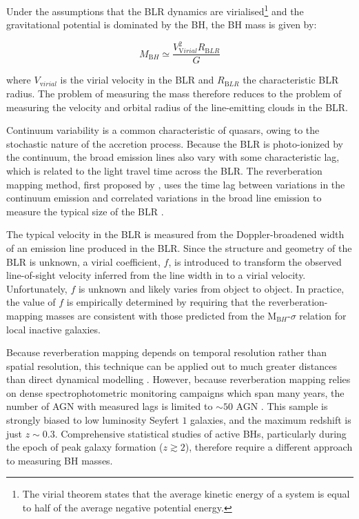 Under the assumptions that the BLR dynamics are virialised\footnote{The virial theorem states that the average kinetic energy of a system is equal to half of the average negative potential energy.} and the gravitational potential is dominated by the BH, the BH mass is given by:

\begin{equation}
M_{\mathrm BH} \simeq \frac{V_{\mathrm Virial}^2R_{\mathrm BLR}}{G} 
\end{equation}

where $V_{\mathrm virial}$ is the virial velocity in the BLR and $R_{\mathrm BLR}$ the characteristic BLR radius.
The problem of measuring the mass therefore reduces to the problem of measuring the velocity and orbital radius of the line-emitting clouds in the BLR. 

Continuum variability is a common characteristic of quasars, owing to the stochastic nature of the accretion process.  
Because the BLR is photo-ionized by the continuum, the broad emission lines also vary with some characteristic lag, which is related to the light travel time across the BLR. 
The reverberation mapping method, first proposed by \citet{blandford82a}, uses the time lag between variations in the continuum emission and correlated variations in the broad line emission to measure the typical size of the BLR \citep[e.g.][]{peterson93,netzer97,peterson14}. 

The typical velocity in the BLR is measured from the Doppler-broadened width of an emission line produced in the BLR. 
Since the structure and geometry of the BLR is unknown, a virial coefficient, $f$, is introduced to transform the observed line-of-sight velocity inferred from the line width in to a virial velocity.
Unfortunately, $f$ is unknown and likely varies from object to object.  
In practice, the value of $f$ is empirically determined by requiring that the reverberation-mapping masses are consistent with those predicted from the M$_{\mathrm BH}$-$\sigma$ relation for local inactive galaxies. 

Because reverberation mapping depends on temporal resolution rather than spatial resolution, this technique can be applied out to much greater distances than direct dynamical modelling \citep[e.g.][]{kormendy13}.
However, because reverberation mapping relies on dense spectrophotometric monitoring campaigns which span many years, the number of AGN with measured lags is limited to $\sim50$ AGN \citep[e.g.][]{kaspi00,peterson04,kaspi07,bentz09,denney10,barth11,grier12}. 
This sample is strongly biased to low luminosity Seyfert $1$ galaxies, and the maximum redshift is just $z\sim0.3$. 
Comprehensive statistical studies of active BHs, particularly during the epoch of peak galaxy formation ($z\gtrsim2$), therefore require a different approach to measuring BH masses. 

